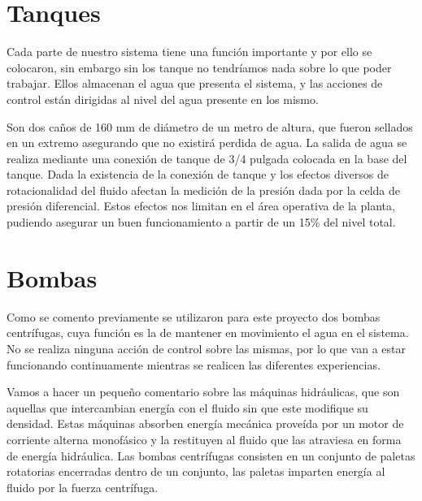 \section{Tanques}
\label{sec:Tanques}

Cada parte de nuestro sistema tiene una función importante y por ello se colocaron, sin embargo sin los
tanque no tendríamos nada sobre lo que poder trabajar. Ellos almacenan el agua que presenta el sistema,
y las acciones de control están dirigidas al nivel del agua presente en los mismo.

Son dos caños de 160 mm de diámetro de un metro de altura, que fueron sellados en un extremo asegurando
que no existirá perdida de agua.
La salida de agua se realiza mediante una conexión de tanque de 3/4 pulgada colocada en la base del 
tanque.
Dada la existencia de la conexión de tanque y los efectos diversos de rotacionalidad del fluido afectan
la medición de la presión dada por la celda de presión diferencial. Estos efectos nos limitan en el 
área operativa de la planta, pudiendo asegurar un buen funcionamiento a partir de un 15\% del nivel 
total. 
\section{Bombas}
\label{sec:Bombas}
Como se comento previamente se utilizaron para este proyecto dos bombas centrífugas, cuya función es
la de mantener en movimiento el agua en el sistema. No se realiza ninguna acción de control sobre las
mismas, por lo que van a estar funcionando continuamente mientras se realicen las diferentes 
experiencias. 

Vamos a hacer un pequeño comentario sobre las máquinas hidráulicas, que son aquellas que intercambian
energía con el fluido sin que este modifique su densidad. Estas máquinas absorben energía mecánica 
proveída por un motor de corriente alterna monofásico y la restituyen al fluido que las atraviesa en
forma de  energía hidráulica. Las bombas centrífugas consisten en un conjunto de paletas rotatorias 
encerradas dentro de un conjunto, las paletas imparten energía al fluido por la fuerza centrífuga.

